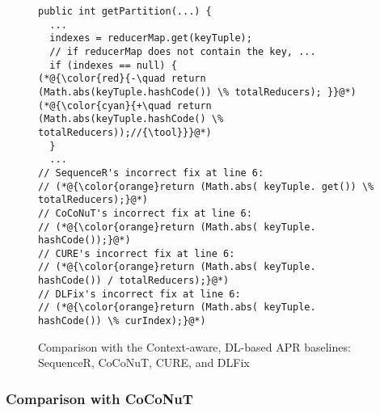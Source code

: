 
\begin{figure}[t]
	\centering
	\begin{lstlisting}[]
public int getPartition(...) {
  ...
  indexes = reducerMap.get(keyTuple);
  // if reducerMap does not contain the key, ...
  if (indexes == null) {
(*@{\color{red}{-\quad return (Math.abs(keyTuple.hashCode()) \% totalReducers);	}}@*)
(*@{\color{cyan}{+\quad return (Math.abs(keyTuple.hashCode() \% totalReducers));//{\tool}}}@*)
  }
  ...
// SequenceR's incorrect fix at line 6:
// (*@{\color{orange}return (Math.abs( keyTuple. get()) \% totalReducers);}@*)
// CoCoNuT's incorrect fix at line 6:
// (*@{\color{orange}return (Math.abs( keyTuple. hashCode());}@*)
// CURE's incorrect fix at line 6:
// (*@{\color{orange}return (Math.abs( keyTuple. hashCode()) / totalReducers);}@*)
// DLFix's incorrect fix at line 6:
// (*@{\color{orange}return (Math.abs( keyTuple. hashCode()) \% curIndex);}@*)
	\end{lstlisting}
        \vspace{-15pt}
	\caption{Comparison with the Context-aware, DL-based APR baselines: SequenceR, CoCoNuT, CURE, and DLFix}
	\label{example_3}
\end{figure}



\subsubsection{\bf Comparison with CoCoNuT}

